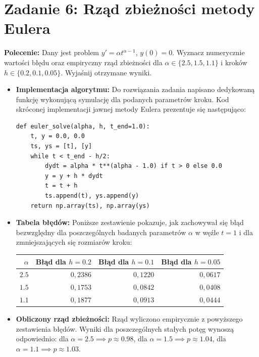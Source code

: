 \documentclass[12pt, a4paper]{article}
\begin{document}
\section{Zadanie 6: Rząd zbieżności metody Eulera}
\textbf{Polecenie:} Dany jest problem $y' = \alpha t^{\alpha-1}$, $y(0) = 0$. Wyznacz numerycznie wartości błędu oraz empiryczny rząd zbieżności dla $\alpha \in \{2.5, 1.5, 1.1\}$ i kroków $h \in \{0.2, 0.1, 0.05\}$. Wyjaśnij otrzymane wyniki.

\begin{itemize}
  \item \textbf{Implementacja algorytmu:} Do rozwiązania zadania napisano dedykowaną funkcję wykonującą symulację dla podanych parametrów kroku. Kod skróconej implementacji jawnej metody Eulera prezentuje się następująco:
\begin{lstlisting}[caption={Skrócony kod rozwiązania}]
def euler_solve(alpha, h, t_end=1.0):
    t, y = 0.0, 0.0
    ts, ys = [t], [y]
    while t < t_end - h/2:
        dydt = alpha * t**(alpha - 1.0) if t > 0 else 0.0
        y = y + h * dydt
        t = t + h
        ts.append(t), ys.append(y)
    return np.array(ts), np.array(ys)
\end{lstlisting}

  \item \textbf{Tabela błędów:} Poniższe zestawienie pokazuje, jak zachowywał się błąd bezwzględny dla poszczególnych badanych parametrów $\alpha$ w węźle $t=1$ i dla zmniejszających się rozmiarów kroku:
\begin{center}
\begin{tabular}{r|r|r|r}
\toprule
$\alpha$ & Błąd dla $h=0.2$ & Błąd dla $h=0.1$ & Błąd dla $h=0.05$ \\
\midrule
$2.5$ & $0{,}2386$ & $0{,}1220$ & $0{,}0617$ \\
$1.5$ & $0{,}1753$ & $0{,}0842$ & $0{,}0408$ \\
$1.1$ & $0{,}1877$ & $0{,}0913$ & $0{,}0444$ \\
\bottomrule
\end{tabular}
\end{center}

  \item \textbf{Obliczony rząd zbieżności:} Rząd wyliczono empirycznie z powyższego zestawienia błędów. Wyniki dla poszczególnych stałych potęg wynoszą odpowiednio: dla $\alpha=2.5 \implies p \approx 0.98$, dla $\alpha=1.5 \implies p \approx 1.04$, dla $\alpha=1.1 \implies p \approx 1.03$. 
  

\end{itemize}
\end{document}
